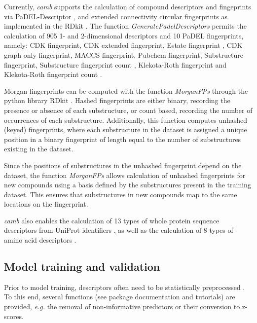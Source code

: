 \documentclass{bioinfo}
\begin{document}
Currently, {\it camb} supports the calculation of compound descriptors and fingeprints via PaDEL-Descriptor \citep{padel},
and extended connectivity circular fingerprints \citep{extended_fp} as implemented in the RDkit \citep{rdkit}.
The function {\it GeneratePadelDescriptors} permits the calculation of 905 1- and 2-dimensional descriptors and 10 PaDEL fingerprints, namely: 
CDK fingerprint, CDK extended fingerprint, Estate fingerprint \cite{state_fp}, CDK graph only fingerprint, MACCS fingerprint,
Pubchem fingerprint, Substructure fingerprint, Substructure fingerprint count \citep{obabel}, Klekota-Roth fingerprint and Klekota-Roth fingerprint count \citep{privileged_substructures}.

Morgan fingerprints can be computed with the function {\it MorganFPs}
through the python library RDkit \citep{rdkit}.
Hashed fingerprints are either binary, recording the presence or absence of each substructure,
 or count based, recording the number of occurrences of each substructure.
Additionally, this function computes unhashed (keyed) fingerprints, 
where each substructure in the dataset is assigned a unique position in a binary fingerprint of length equal to the number of substructures existing in the dataset.

Since the positions of substructures in the unhashed fingerprint depend on the dataset, the function {\it MorganFPs} allows calculation of unhashed fingerprints for new compounds using a basis defined by the substructures present in the training dataset. This ensures that substructures in new compounds map to the same locations on the fingerprint.

{\it camb} also enables the calculation of 13 types of whole protein sequence descriptors
from UniProt identifiers \citep{protr},
as well as the calculation of 8 types of amino acid descriptors \citep{AA_benchmark}.

\subsection{Model training and validation}

Prior to model training, descriptors often need to be statistically preprocessed \citep{andersson}.
To this end, several functions (see package documentation and tutorials)
are provided, {\it e.g.} the removal of non-informative predictors or
their conversion to z-scores.
\end{document}
